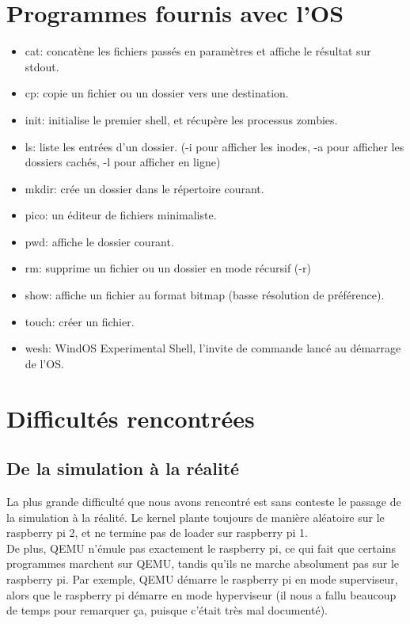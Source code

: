 \documentclass[a4paper]{article}
\begin{document}
\section{Programmes fournis avec l'OS}
\begin{itemize}
	\item cat: concatène les fichiers passés en paramètres et affiche le résultat sur stdout.
	\item cp: copie un fichier ou un dossier vers une destination.
	\item init: initialise le premier shell, et récupère les processus zombies.
	\item ls: liste les entrées d'un dossier. (-i pour afficher les inodes, -a pour afficher les dossiers cachés, -l pour afficher en ligne)
	\item mkdir: crée un dossier dans le répertoire courant.
	\item pico: un éditeur de fichiers minimaliste.
	\item pwd: affiche le dossier courant.
	\item rm: supprime un fichier ou un dossier en mode récursif (-r)
	\item show: affiche un fichier au format bitmap (basse résolution de préférence).
	\item touch: créer un fichier.
	\item wesh: WindOS Experimental Shell, l'invite de commande lancé au démarrage de l'OS.
\end{itemize}

\section{Difficultés rencontrées}

\subsection{De la simulation à la réalité}

La plus grande difficulté que nous avons rencontré est sans conteste le passage
de la simulation à la réalité. Le kernel plante toujours de manière aléatoire
sur le raspberry pi 2, et ne termine pas de loader sur raspberry pi 1.\\

De plus, QEMU n'émule pas exactement le raspberry pi, ce qui fait que certains
programmes marchent sur QEMU, tandis qu'ils ne marche absolument pas sur le
raspberry pi. Par exemple, QEMU démarre le raspberry pi en mode superviseur,
alors que le raspberry pi démarre en mode hyperviseur (il nous a fallu beaucoup
de temps pour remarquer ça, puisque c'était très mal documenté).
\end{document}
